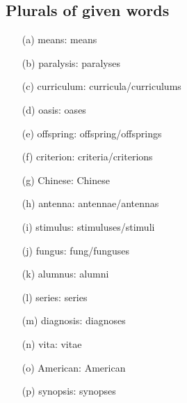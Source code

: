 \documentclass[paper=a4, fontsize=11pt]{scrartcl} %
\numberwithin{equation}{section} %
\numberwithin{figure}{section} %
\numberwithin{table}{section} %
\begin{document}
	\subsection{Plurals of given words}
		\begin{enumerate}
			\item[(a)] means: means
			\item[(b)] paralysis: paralyses
			\item[(c)] curriculum: curricula/curriculums
			\item[(d)] oasis: oases
			\item[(e)] offspring: offspring/offsprings
			\item[(f)] criterion: criteria/criterions
			\item[(g)] Chinese: Chinese
			\item[(h)] antenna: antennae/antennas
			\item[(i)] stimulus: stimuluses/stimuli
			\item[(j)] fungus: fung/funguses
			\item[(k)] alumnus: alumni
			\item[(l)] series: series
			\item[(m)] diagnosis: diagnoses
			\item[(n)] vita: vitae
			\item[(o)] American: American
			\item[(p)] synopsis: synopses
		\end{enumerate}
	
\end{document}
